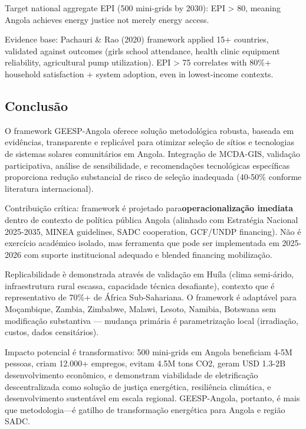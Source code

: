 \documentclass[12pt, a4paper]{article}
\begin{document}
Target national aggregate EPI (500 mini-grids by 2030): EPI > 80, meaning Angola achieves energy justice not merely energy access.

Evidence base: Pachauri \& Rao (2020) framework applied 15+ countries, validated against outcomes (girls school attendance, health clinic equipment reliability, agricultural pump utilization). EPI > 75 correlates with 80\%+ household satisfaction + system adoption, even in lowest-income contexts.

\subsection{Conclusão}

O framework GEESP-Angola oferece solução metodológica robusta, baseada em evidências, transparente e replicável para otimizar seleção de sítios e tecnologias de sistemas solares comunitários em Angola. Integração de MCDA-GIS, validação participativa, análise de sensibilidade, e recomendações tecnológicas específicas proporciona redução substancial de risco de seleção inadequada (40-50\% conforme literatura internacional).

Contribuição crítica: framework é projetado para\textbf{operacionalização imediata} dentro de contexto de política pública Angola (alinhado com Estratégia Nacional 2025-2035, MINEA guidelines, SADC cooperation, GCF/UNDP financing). Não é exercício académico isolado, mas ferramenta que pode ser implementada em 2025-2026 com suporte institucional adequado e blended financing mobilização.

Replicabilidade è demonstrada através de validação em Huíla (clima semi-árido, infraestrutura rural escassa, capacidade técnica desafiante), contexto que é representativo de 70\%+ de África Sub-Sahariana. O framework é adaptável para Moçambique, Zambia, Zimbabwe, Malawi, Lesoto, Namibia, Botswana sem modificação substantiva — mudança primária é parametrização local (irradiação, custos, dados censitários).

Impacto potencial é transformativo: 500 mini-grids em Angola beneficiam 4-5M pessoas, criam 12.000+ empregos, evitam 4.5M tons CO2, geram USD 1.3-2B desenvolvimento econômico, e demonstram viabilidade de eletrificação descentralizada como solução de justiça energética, resiliência climática, e desenvolvimento sustentável em escala regional. GEESP-Angola, portanto, é mais que metodologia—é gatilho de transformação energética para Angola e região SADC.


\newpage
\end{document}
